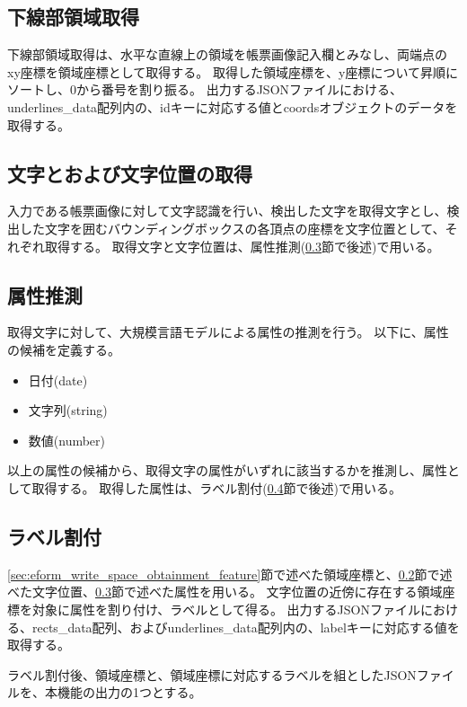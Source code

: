 \subsection{下線部領域取得}\label{subsec:underline_coords_obtainment}
下線部領域取得は、水平な直線上の領域を帳票画像記入欄とみなし、両端点のxy座標を領域座標として取得する。
取得した領域座標を、y座標について昇順にソートし、0から番号を割り振る。
出力するJSONファイルにおける、underlines\_data配列内の、idキーに対応する値とcoordsオブジェクトのデータを取得する。

\subsection{文字とおよび文字位置の取得}\label{subsec:char_and_bbox_obtainment}
入力である帳票画像に対して文字認識を行い、検出した文字を取得文字とし、検出した文字を囲むバウンディングボックスの各頂点の座標を文字位置として、それぞれ取得する。
取得文字と文字位置は、属性推測(\ref{subsec:att_prediction}節で後述)で用いる。

\subsection{属性推測}\label{subsec:att_prediction}
取得文字に対して、大規模言語モデルによる属性の推測を行う。
以下に、属性の候補を定義する。

\begin{itemize}
    \item 日付(date)
    \item 文字列(string)
    \item 数値(number)
\end{itemize}

以上の属性の候補から、取得文字の属性がいずれに該当するかを推測し、属性として取得する。
取得した属性は、ラベル割付(\ref{subsec:label_link}節で後述)で用いる。

\subsection{ラベル割付}\label{subsec:label_link}
\ref{sec:eform_write_space_obtainment_feature}節で述べた領域座標と、\ref{subsec:char_and_bbox_obtainment}節で述べた文字位置、\ref{subsec:att_prediction}節で述べた属性を用いる。
文字位置の近傍に存在する領域座標を対象に属性を割り付け、ラベルとして得る。
出力するJSONファイルにおける、rects\_data配列、およびunderlines\_data配列内の、labelキーに対応する値を取得する。

ラベル割付後、領域座標と、領域座標に対応するラベルを組としたJSONファイルを、本機能の出力の1つとする。


